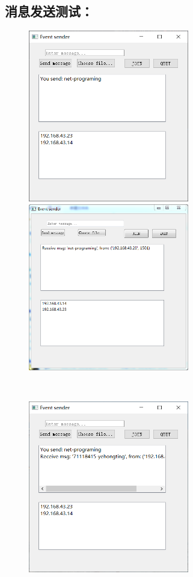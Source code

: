 \documentclass[UTF8]{ctexart}
\begin{document}
\subsection{消息发送测试：}{
\begin{figure}
	\centering
	\begin{minipage}{7cm}
		\includegraphics[width=7cm]{send_msg_1.png}
	\end{minipage}
	\begin{minipage}{7cm}
		\includegraphics[width=7cm]{rece_msg_1.png}
	\end{minipage}\\
	\begin{minipage}{7cm}
		\includegraphics[width=7cm]{rece_msg_2.png}

\end{minipage}
\end{figure}}
\end{document}

